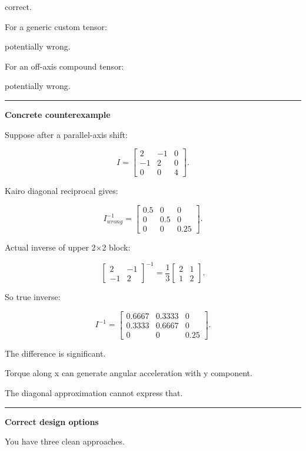 correct.

For a generic custom tensor:

potentially wrong.

For an off-axis compound tensor:

potentially wrong.

\begin{center}\rule{0.5\linewidth}{0.5pt}\end{center}

\textbf{Concrete counterexample}

Suppose after a parallel-axis shift:

\[
I=
\begin{bmatrix}
2&-1&0\\
-1&2&0\\
0&0&4
\end{bmatrix}.
\]

Kairo diagonal reciprocal gives:

\[
I^{-1}_{wrong}
=
\begin{bmatrix}
0.5&0&0\\
0&0.5&0\\
0&0&0.25
\end{bmatrix}.
\]

Actual inverse of upper 2×2 block:

\[
\begin{bmatrix}
2&-1\\
-1&2
\end{bmatrix}^{-1}
=
\frac13
\begin{bmatrix}
2&1\\
1&2
\end{bmatrix}.
\]

So true inverse:

\[
I^{-1}
=
\begin{bmatrix}
0.6667&0.3333&0\\
0.3333&0.6667&0\\
0&0&0.25
\end{bmatrix}.
\]

The difference is significant.

Torque along x can generate angular acceleration with y component.

The diagonal approximation cannot express that.

\begin{center}\rule{0.5\linewidth}{0.5pt}\end{center}

\textbf{Correct design options}

You have three clean approaches.

